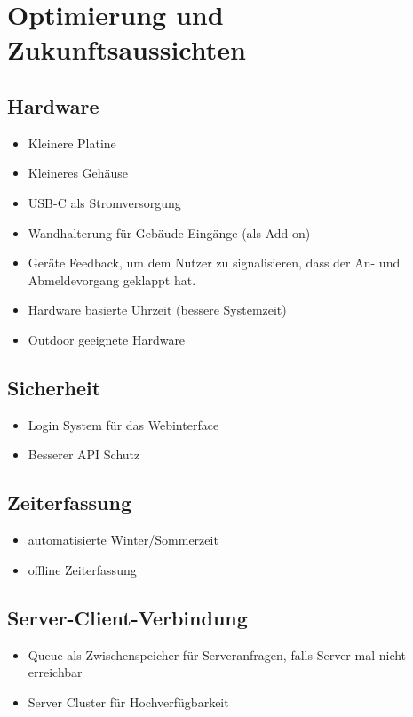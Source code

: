 \documentclass[../main.tex]{subfiles}
\begin{document}
\section{Optimierung und Zukunftsaussichten}

\subsection{Hardware}
\begin{itemize}
  \item Kleinere Platine
  \item Kleineres Gehäuse
  \item USB-C als Stromversorgung
  \item Wandhalterung für Gebäude-Eingänge (als Add-on)
  \item Geräte Feedback, um dem Nutzer zu signalisieren, dass der An- und Abmeldevorgang geklappt hat.
  \item Hardware basierte Uhrzeit (bessere Systemzeit)
  \item Outdoor geeignete Hardware
\end{itemize}

\subsection{Sicherheit}
\begin{itemize}
    \item Login System für das Webinterface 
    \item Besserer API Schutz
\end{itemize}

\subsection{Zeiterfassung}
\begin{itemize} 
    \item automatisierte Winter/Sommerzeit %
    \item offline Zeiterfassung
\end{itemize}

\subsection{Server-Client-Verbindung}
\begin{itemize} 
    \item Queue als Zwischenspeicher für Serveranfragen, falls Server mal nicht erreichbar
    \item Server Cluster für Hochverfügbarkeit
\end{itemize}
\end{document}
